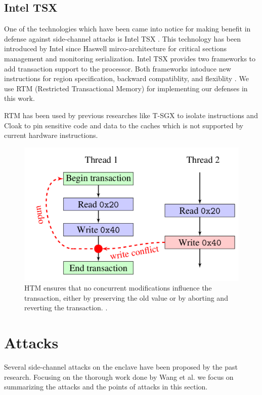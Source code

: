 \subsection{Intel TSX}
One of the technologies which have been came into notice for making benefit in defense against side-channel attacks is Intel TSX \cite{tsx}. This technology has been introduced by Intel since Haswell mirco-architecture \cite{haswell} for critical sections management and monitoring serialization. Intel TSX provides two frameworks to add transaction support to the processor. Both frameworks intoduce new instructions for region specification, backward compatiblity, and flexiblity \cite{tsx}. We use RTM (Restricted Transactional Memory) \cite{rtm} for implementing our defenses in this work.

RTM has been used by previous researches like T-SGX \cite{tsgx} to isolate instructions and Cloak \cite{cloak} to pin sensitive code and data to the caches which is not supported by current hardware instructions.


\begin{figure}
	\includegraphics[scale=0.2]{images/rtm}
	\caption{HTM ensures that no concurrent modifications influence the transaction, either by preserving the old value or by aborting and reverting the transaction. \cite{cloak}.}
	\label{fig:rtm}
\end{figure}


\section{Attacks}
Several side-channel attacks on the enclave have been proposed by the past research. Focusing on the thorough work done by Wang et al. \cite{leakycauldron} we focus on summarizing the attacks and the points of attacks in this section.

